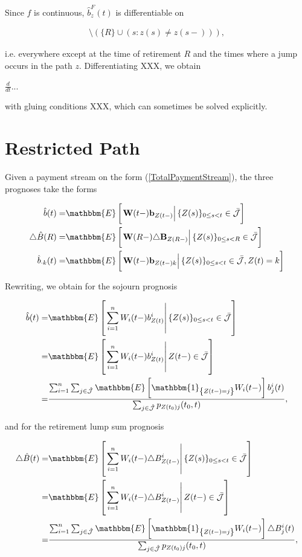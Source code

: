 \documentclass{book}
\newcommand{\1}[1]{\mathbbm{1}_{\left\lbrace #1 \right\rbrace}}
\newcommand{\expec}[1][def]{\mathbbm{E} \left[ #1 \right]}
\newcommand{\econd}[2][def]{\mathbbm{E} \left[ \left. #1 \right| #2 \right]}
\theoremstyle{break}
\theoremstyle{remark}
\numberwithin{equation}{section}
\begin{document}
Since $f$ is continuous, $\hat{b}_z^{F}(t)$ is differentiable on

\begin{align*}
	[0,n] \setminus \left( \{ R \} \cup \left( s : z(s) \neq z(s-) \right) \right),
\end{align*}

i.e. everywhere except at the time of retirement $R$ and the times where a jump occurs in the path $z$. Differentiating XXX, we obtain

$\frac{d}{dt}...$

with gluing conditions XXX, which can sometimes be solved explicitly.

\section{Restricted Path}

Given a payment stream on the form (\ref{TotalPaymentStream}), the three prognoses take the forms

\begin{align}
\hat{b}(t) =& \econd[\textbf{W}(t-) \textbf{b}_{Z(t-)}]{\{Z(s) \}_{0 \leq s < t} \in \bar{\mathcal{J}}} \\
\triangle  \hat{B}(R) =& \econd[\textbf{W}(R-) \triangle \textbf{B}_{Z(R-)}]{\{Z(s) \}_{0 \leq s < R} \in \bar{\mathcal{J}}} \\
\hat{b}_{\cdot k}(t) =& \econd[\textbf{W}(t-) \textbf{b}_{Z(t-)k}]{\{Z(s) \}_{0 \leq s < t} \in \bar{\mathcal{J}}, Z(t) = k}
\end{align}

Rewriting, we obtain for the sojourn prognosis

\begin{align*}
	 \hat{b}(t) =& \econd[\sum_{i=1}^n W_i(t-)b_{Z(t)}^i]{\{Z(s) \}_{0 \leq s < t} \in \bar{\mathcal{J}}} \\
	 =& \econd[\sum_{i=1}^n W_i(t-)b_{Z(t)}^i]{Z(t-) \in \bar{\mathcal{J}}} \\
	 =&\frac{\sum_{i=1}^n \sum_{j \in \hat{\mathcal{J}}} \expec[\1{Z(t-)=j} W_i(t-)] b_j^i(t)}{\sum_{j \in \hat{\mathcal{J}}} p_{Z(t_0)j}(t_0,t)},
\end{align*}

and for the retirement lump sum prognosis

\begin{align*}
\triangle \hat{B}(t) =& \econd[\sum_{i=1}^n W_i(t-) \triangle B_{Z(t-)}^i]{\{Z(s) \}_{0 \leq s < t} \in \bar{\mathcal{J}}} \\
=& \econd[\sum_{i=1}^n W_i(t-) \triangle B_{Z(t-)}^i]{Z(t-) \in \bar{\mathcal{J}}} \\
=&\frac{\sum_{i=1}^n \sum_{j \in \hat{\mathcal{J}}} \expec[\1{Z(t-)=j} W_i(t-)] \triangle B_j^i(t)}{\sum_{j \in \hat{\mathcal{J}}} p_{Z(t_0)j}(t_0,t)},
\end{align*}
\end{document}
